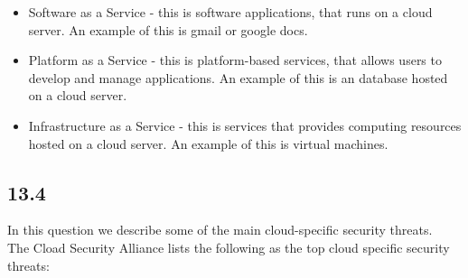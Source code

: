 \documentclass{article}
\begin{document}
\begin{itemize}
    \item Software as a Service - this is software applications, that runs on a cloud server. An example of this is gmail or google docs. 

\item Platform as a Service - this is platform-based services, that allows users to develop and manage applications. An example of this is an database hosted on a cloud server. 

\item Infrastructure as a Service - this is services that provides computing resources hosted on a cloud server. An example of this is virtual machines. 
\end{itemize}

\subsection{13.4}
In this question we describe some of the main cloud-specific security threats. \\
The Cload Security Alliance lists the following as the top cloud specific security
threats:
\end{document}
